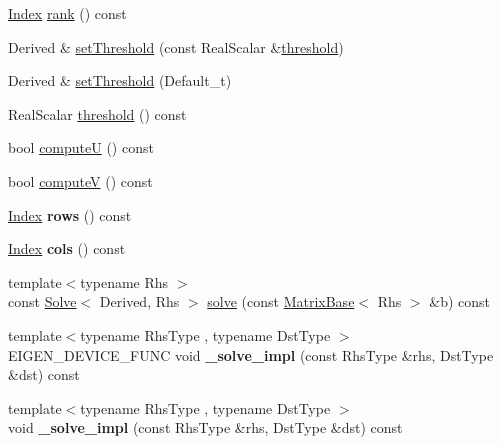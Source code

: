 \begin{DoxyCompactItemize}
\item 
\hyperlink{group___s_v_d___module_a6229a37997eca1072b52cca5ee7a2bec}{Index} \hyperlink{group___s_v_d___module_a30b89e24f42f1692079eea31b361d26a}{rank} () const
\item 
Derived \& \hyperlink{group___s_v_d___module_a1c95d05398fc15e410a28560ef70a5a6}{set\+Threshold} (const Real\+Scalar \&\hyperlink{group___s_v_d___module_a98b2ee98690358951807353812a05c69}{threshold})
\item 
Derived \& \hyperlink{group___s_v_d___module_a27586b69dbfb63f714d1d45fd6304f97}{set\+Threshold} (Default\+\_\+t)
\item 
Real\+Scalar \hyperlink{group___s_v_d___module_a98b2ee98690358951807353812a05c69}{threshold} () const
\item 
bool \hyperlink{group___s_v_d___module_a705a7c2709e1624ccc19aa748a78d473}{computeU} () const
\item 
bool \hyperlink{group___s_v_d___module_a5f12efcb791eb007d4a4890ac5255ac4}{computeV} () const
\item 
\mbox{\label{group___s_v_d___module_ab1a0d1fcc818a876c3cb2b32887604be}} 
\hyperlink{group___s_v_d___module_a6229a37997eca1072b52cca5ee7a2bec}{Index} {\bfseries rows} () const
\item 
\mbox{\label{group___s_v_d___module_a083d99e05949bab974bbff2966606b7f}} 
\hyperlink{group___s_v_d___module_a6229a37997eca1072b52cca5ee7a2bec}{Index} {\bfseries cols} () const
\item 
{\footnotesize template$<$typename Rhs $>$ }\\const \hyperlink{group___core___module_class_eigen_1_1_solve}{Solve}$<$ Derived, Rhs $>$ \hyperlink{group___s_v_d___module_ab28499936c0764fe5b56b9f4de701e26}{solve} (const \hyperlink{group___core___module_class_eigen_1_1_matrix_base}{Matrix\+Base}$<$ Rhs $>$ \&b) const
\item 
\mbox{\label{group___s_v_d___module_abf33b0dd55b31392ef321d491bf4fc27}} 
{\footnotesize template$<$typename Rhs\+Type , typename Dst\+Type $>$ }\\E\+I\+G\+E\+N\+\_\+\+D\+E\+V\+I\+C\+E\+\_\+\+F\+U\+NC void {\bfseries \+\_\+solve\+\_\+impl} (const Rhs\+Type \&rhs, Dst\+Type \&dst) const
\item 
\mbox{\label{group___s_v_d___module_ac3cd36e54727b6ae24e71b67d7e290dc}} 
{\footnotesize template$<$typename Rhs\+Type , typename Dst\+Type $>$ }\\void {\bfseries \+\_\+solve\+\_\+impl} (const Rhs\+Type \&rhs, Dst\+Type \&dst) const
\end{DoxyCompactItemize}
